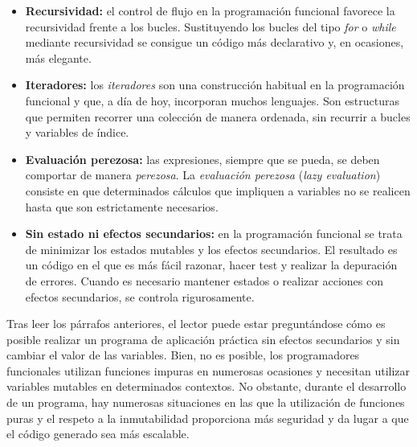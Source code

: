 \begin{itemize}
   \vspace{0.5em}

   \item \textbf{Recursividad:} el control de flujo en la programación funcional favorece la recursividad frente a los bucles. Sustituyendo los bucles del tipo \textit{for} o \textit{while} mediante recursividad se consigue un código más declarativo y, en ocasiones, más elegante.
   
   \vspace{0.5em}

   \item \textbf{Iteradores:} los \textit{iteradores} son una construcción habitual en la programación funcional y que, a día de hoy, incorporan muchos lenguajes. Son estructuras que permiten recorrer una colección de manera ordenada, sin recurrir a bucles y variables de índice. 
   
   \vspace{0.5em}

   \item \textbf{Evaluación perezosa:} las expresiones, siempre que se pueda, se deben comportar de manera \textit{perezosa}. La \textit{evaluación perezosa} (\textit{lazy evaluation}) consiste en que determinados cálculos que impliquen a variables no se realicen hasta que son estrictamente necesarios.
   
   \vspace{0.5em}

   \item \textbf{Sin estado ni efectos secundarios:} en la programación funcional se trata de minimizar los estados mutables y los efectos secundarios. El resultado es un código en el que es más fácil razonar, hacer test y realizar la depuración de errores. Cuando es necesario mantener estados o realizar acciones con efectos secundarios, se controla rigurosamente.
\end{itemize}

Tras leer los párrafos anteriores, el lector puede estar preguntándose cómo es posible realizar un programa de aplicación práctica sin efectos secundarios y sin cambiar el valor de las variables. Bien, no es posible, los programadores funcionales utilizan funciones impuras en numerosas ocasiones y necesitan utilizar variables mutables en determinados contextos. No obstante, durante el desarrollo de un programa, hay numerosas situaciones en las que la utilización de funciones puras y el respeto a la inmutabilidad proporciona más seguridad y da lugar a que el código generado sea más escalable.

